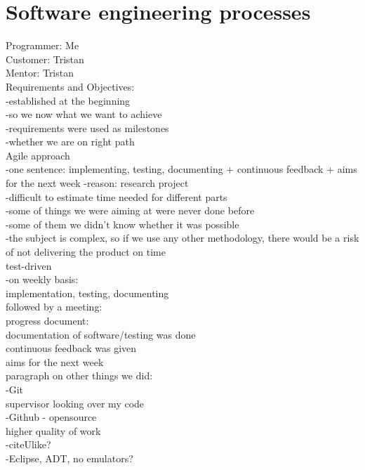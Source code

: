\section{Software engineering processes}
\label{s:processes}
Programmer: Me\\	
Customer: Tristan\\
Mentor: Tristan\\

Requirements and Objectives:\\
	-established at the beginning\\
		-so we now what we want to achieve\\
	-requirements were used as milestones\\
		-whether we are on right path\\

Agile approach\\
	-one sentence: implementing, testing, documenting + continuous feedback + aims for the next week
	-reason: research project\\
		-difficult to estimate time needed for different parts\\
			-some of things we were aiming at were never done before\\
			-some of them we didn't know whether it was possible\\
		-the subject is complex, so if we use any other methodology, there would be a risk of not delivering the product on time\\
		test-driven\\
			
	-on weekly basis:\\
		implementation, testing, documenting\\
		followed by a meeting:\\
			progress document:\\
				documentation of software/testing was done\\
			continuous feedback was given\\
			aims for the next week\\
			
paragraph on other things we did:\\
	-Git\\
		supervisor looking over my code\\
	-Github - opensource\\
		higher quality of work\\
	-citeUlike?\\
	-Eclipse, ADT, no emulators?\\
	